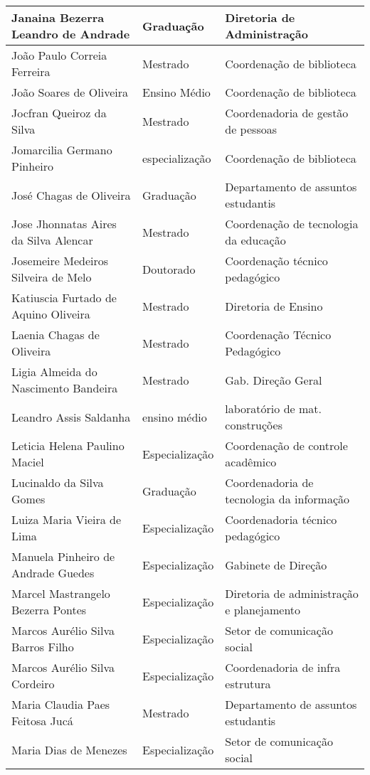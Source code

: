 \begin{longtable}{|p{6cm}|p{3cm}|p{4cm}|}
Janaina Bezerra Leandro de Andrade & Graduação & Diretoria de Administração\\
\hline
João Paulo Correia Ferreira & Mestrado & Coordenação de biblioteca\\
\hline
João Soares de Oliveira & Ensino Médio & Coordenação de biblioteca\\
\hline
Jocfran Queiroz da Silva & Mestrado & Coordenadoria de gestão de pessoas\\
\hline
Jomarcilia Germano Pinheiro & especialização & Coordenação de biblioteca\\
\hline
José Chagas de Oliveira & Graduação & Departamento de assuntos estudantis\\
\hline
Jose Jhonnatas Aires da Silva Alencar & Mestrado & Coordenação de tecnologia da educação\\
\hline
Josemeire Medeiros Silveira de Melo & Doutorado & Coordenação técnico pedagógico\\
\hline
Katiuscia Furtado de Aquino Oliveira & Mestrado & Diretoria de Ensino\\
\hline
Laenia Chagas de Oliveira & Mestrado & Coordenação Técnico Pedagógico\\
\hline
Ligia Almeida do Nascimento Bandeira & Mestrado & Gab. Direção Geral\\
\hline
Leandro Assis Saldanha & ensino médio & laboratório de mat. construções\\
\hline
Leticia Helena Paulino Maciel & Especialização & Coordenação de controle acadêmico\\
\hline
Lucinaldo da Silva Gomes & Graduação & Coordenadoria de tecnologia da informação \\
\hline
Luiza Maria Vieira de Lima & Especialização & Coordenadoria técnico pedagógico\\
\hline
Manuela Pinheiro de Andrade Guedes & Especialização & Gabinete de Direção\\
\hline
Marcel Mastrangelo Bezerra Pontes & Especialização & Diretoria de administração e planejamento\\
\hline
Marcos Aurélio Silva Barros Filho & Especialização & Setor de comunicação social\\
\hline
Marcos Aurélio Silva Cordeiro & Especialização & Coordenadoria de infra estrutura\\
\hline
Maria Claudia Paes Feitosa Jucá & Mestrado & Departamento de assuntos estudantis\\
\hline
Maria Dias de Menezes & Especialização & Setor de comunicação social\\

\end{longtable}

